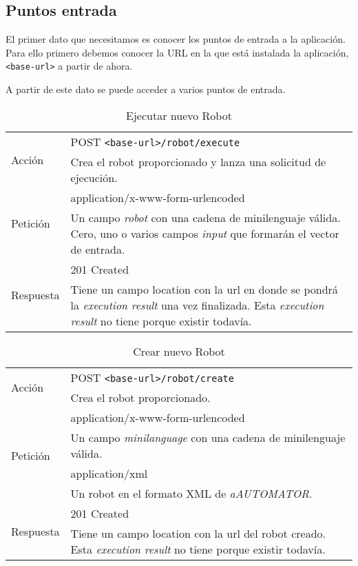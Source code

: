 \subsection{Puntos entrada}
El primer dato que necesitamos es conocer los puntos de entrada a la
aplicación. Para ello primero debemos conocer la URL en la que está
instalada la aplicación, \verb+<base-url>+ a partir de ahora.

A partir de este dato se puede acceder a varios puntos de entrada.

\begin{table}[hp]
\begin{tabularx}{\textwidth}{l X}
\multirow{2}{*}{Acción}
 & POST \verb+<base-url>/robot/execute+ \\
 & Crea el robot proporcionado y lanza una solicitud de
ejecución.\\ \hline
\multirow{2}{*}{Petición}
 & application/x-www-form-urlencoded \\
 & Un campo \emph{robot} con una cadena de
  minilenguaje válida. \newline
  Cero, uno o varios campos \emph{input} que formarán el vector de
  entrada.\\ \hline
\multirow{2}{*}{Respuesta}
& 201 Created \\
& Tiene un campo location con la url en donde se pondrá la \emph{execution result}
una vez finalizada.
Esta \emph{execution result} no tiene porque existir todavía.\\
\end{tabularx}
\caption{Ejecutar nuevo Robot}
\label{execute_new_robot}
\end{table}

\begin{table}[hp]
\begin{tabularx}{\textwidth}{l X}
\multirow{2}{*}{Acción}
 & POST \verb+<base-url>/robot/create+ \\
 & Crea el robot proporcionado.\\ \hline
\multirow{4}{*}{Petición}
 & application/x-www-form-urlencoded \\
 & Un campo \emph{minilanguage} con una cadena de
  minilenguaje válida.\\ \cline{2-2}
 & application/xml \\
 & Un robot en el formato XML de \emph{aAUTOMATOR}.\\ \hline
\multirow{2}{*}{Respuesta}
& 201 Created \\
& Tiene un campo location con la url del robot creado.
Esta \emph{execution result} no tiene porque existir todavía.\\
\end{tabularx}
\caption{Crear nuevo Robot}
\label{create_new_robot}
\end{table}
\newpage


